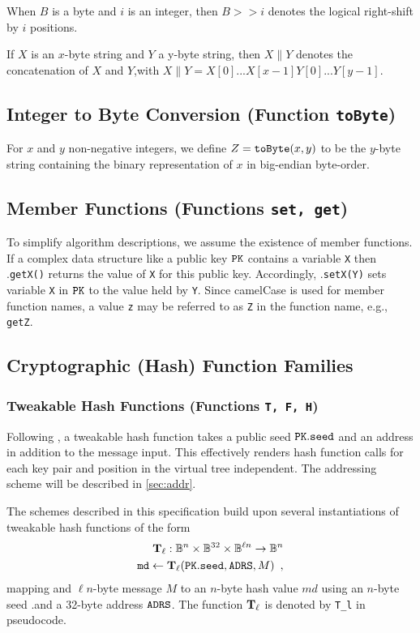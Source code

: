 When $B$ is a byte and $i$ is an integer, then $B >> i$ denotes the logical right-shift by $i$ positions.

If $X$ is an $x$-byte string and $Y$ a y-byte string, then $X \| Y$ denotes the concatenation of $X$ and $Y$,with $X\|Y = X[0]...X[x-1] Y[0]...Y[y-1]$.

\subsection{Integer to Byte Conversion (Function \texttt{toByte})}

For $x$ and $y$ non-negative integers, we define $Z = {\tt toByte}(x,y) $ to be the $y$-byte string containing the binary representation of $x$ in big-endian byte-order.

\subsection{Member Functions (Functions \texttt{set, get})}

To simplify algorithm descriptions, we assume the existence of member functions. If a complex data structure like a public key $\pk$ contains a variable \texttt{X} then \pk.\texttt{getX()} returns the value of \texttt{X} for this public key. Accordingly, \pk.\texttt{setX(Y)} sets variable \texttt{X} in $\pk$ to the value held by \texttt{Y}. Since camelCase is used for member function names, a value \texttt{z} may be referred to as \texttt{Z} in the function name, e.g., \texttt{getZ}.

\subsection{Cryptographic (Hash) Function Families} 

\subsubsection{Tweakable Hash Functions (Functions \texttt{T, F, H})}

Following \SPHINCSP, a tweakable hash function takes a public seed $\pk.\seed$ and an address \ADRS in addition to the message input. This effectively renders hash function calls for each key pair and position in the virtual tree independent. The addressing scheme will be described in \cref{sec:addr}.
 

The schemes described in this specification build upon several instantiations of tweakable hash functions of the form
\begin{align*}
    \Th_\ell : \byte^n \times \byte^{32} \times \byte^{\ell n} \to \byte^n \\
    \md \gets \Th_\ell (\pk.\seed, \ADRS, M) \enspace,
\end{align*}
mapping and $\ell n$-byte message $M$ to an $n$-byte hash value $md$ using an $n$-byte seed \pk.\seed and a 32-byte address $\mathtt{ADRS}$. The function $\mathbf{T}_\ell$ is denoted by \texttt{T\_l} in pseudocode.

